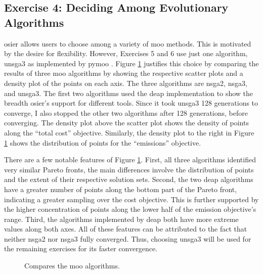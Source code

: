 \subsection{Exercise 4: Deciding Among Evolutionary Algorithms}
\label{section:4-exercise-4}

\ac{osier} allows users to choose among a variety of \ac{moo} methods. This is
motivated by the desire for flexibility. However, Exercises 5 and 6 use just one
algorithm, \ac{unsga3} as implemented by \ac{pymoo} \cite{blank_pymoo_2020}. Figure
\ref{fig:algorithm-comparison} justifies this choice by comparing the results of
three \ac{moo} algorithms by showing the respective scatter plots and a density
plot of the points on each axis. The three algorithms are \ac{nsga2},
\ac{nsga3}, and \ac{unsga3}. The first two algorithms used the \ac{deap} \cite{fortin_deap_2012}
implementation to show the breadth \ac{osier}'s support for different tools.
Since it took \ac{unsga3} 128 generations to converge, I also stopped the other
two algorithms after 128 generations, before converging. The density plot above
the scatter plot shows the density of points along the ``total cost'' objective.
Similarly, the density plot to the right in Figure
\ref{fig:algorithm-comparison} shows the distribution of points for the
``emissions'' objective.

There are a few notable features of Figure \ref{fig:algorithm-comparison}.
First, all three algorithms identified very similar Pareto fronts, the main
differences involve the distribution of points and the extent of their
respective solution sets. Second, the two \ac{deap} algorithms have a greater
number of points along the bottom part of the Pareto front, indicating a greater
sampling over the cost objective. This is further supported by the higher
concentration of points along the lower half of the emission objective's range.
Third, the algorithms implemented by \ac{deap} both have more extreme values
along both axes. All of these features can be attributed to the fact that
neither \ac{nsga2} nor \ac{nsga3} fully converged. Thus, choosing \ac{unsga3}
will be used for the remaining exercises for its faster convergence.

\begin{figure}[ht]
  \centering
  \resizebox{0.75\columnwidth}{!}{}
  \caption{Compares the \ac{moo} algorithms.}
  \label{fig:algorithm-comparison}
\end{figure}

\FloatBarrier
